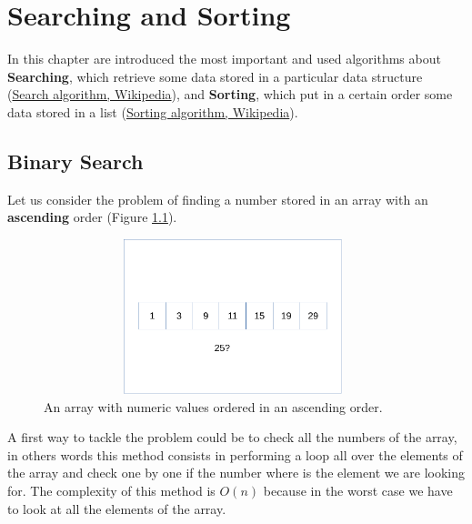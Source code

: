 \setchapterpreamble[u]{\margintoc}
\chapter{Searching and Sorting}
In this chapter are introduced the most important and used algorithms about \textbf{Searching}, which retrieve some data stored in a particular data structure \cite{wikisearch} (\href{https://en.wikipedia.org/wiki/Search_algorithm}{Search algorithm, Wikipedia}), and \textbf{Sorting}, which put in a certain order some data stored in a list \cite{wikisorting} (\href{https://en.wikipedia.org/wiki/Sorting_algorithm}{Sorting algorithm, Wikipedia}).
\section{Binary Search}
Let us consider the problem of finding a number stored in an array with an \textbf{ascending} order (Figure \ref{sorting_1}).

\begin{figure}[hb]
	\includegraphics[width=11cm,height=4.5cm]{chapters/searchandsorting/images/sorting_1.pdf}
	\caption[]{An array with numeric values ordered in an ascending order.}
	\label{sorting_1}
\end{figure}

A first way to tackle the problem could be to check all the numbers of the array, in others words this method consists in performing a loop all over the elements of the array and check one by one if the number where is the element we are looking for. The complexity of this method is \(O(n)\) because in the worst case we have to look at all the elements of the array. 

